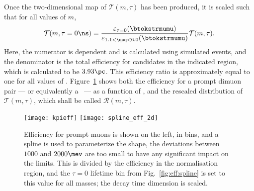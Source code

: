 Once the two-dimensional map of $\mathcal{T}(m,\tau)$ has been produced, it is scaled such that
for all values of $m$,
\begin{equation}
  \mathcal{T}(m,\tau=0\ns) =
  \frac{
    \varepsilon_{\tau=0}(\btokstrmumu)
  }{
    \varepsilon_{1.1<\qsq<6.0}(\btokstrmumu)
  }
  \mathcal{T}(m,\tau).
\end{equation}
Here, the numerator is \qsq dependent and is calculated using
simulated events, and the denominator is the total
efficiency for candidates in the indicated \qsq region, which is calculated to be $3.93\pc$.
This efficiency ratio is approximately equal to one for all values of \mass{\db}.
Figure~\ref{fig:eff:effmap} shows both the efficiency for a prompt dimuon pair --- or equivalently
a \db\ --- as a function of \qsq, and the rescaled distribution of $\mathcal{T}(m,\tau)$, which
shall
be called $\mathcal{R}(m,\tau)$.

\begin{figure}
  \begin{center}
    \texttt{[image: kpieff]}
    \texttt{[image: spline\_eff\_2d]}
    \caption[Relative efficiency map]
    {
      Efficiency \btokstrmumu for prompt muons is shown on the left, in bins, and a spline is used
      to parameterize the shape, the deviations between $1000$ and $2000\mev$ are too small to have
      any significant impact on the limits.
      This is divided by the efficiency in the normalisation region, and the $\tau=0$ lifetime bin
      from Fig.~\ref{fig:eff:spline} is set to this value for all masses; the decay time dimension
      is scaled.
    }
    \label{fig:eff:effmap}
  \end{center}
\end{figure}



